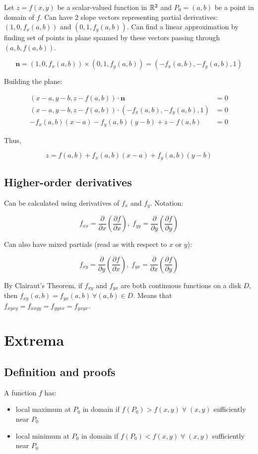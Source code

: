 Let $z=f(x,y)$ be a scalar-valued function in $\mathbb{R}^2$ and $P_0=(a,b)$ be a point in domain of $f$. Can have 2 slope vectors representing partial derivatives:
$(1,0,f_x(a,b))$ and $(0,1,f_y(a,b))$. Can find a linear approximation by finding set of points in plane spanned by these vectors passing through
$(a,b,f(a,b))$.

\[\textbf{n}=(1,0,f_x(a,b))\times(0,1,f_y(a,b))=(-f_x(a,b),-f_y(a,b),1)\]

Building the plane:

\begin{align*}
    (x-a, y-b, z-f(a, b)) \cdot \textbf{n} &=0 \\
    (x-a, y-b, z-f(a, b)) \cdot\left(-f_{x}(a, b),-f_{y}(a, b), 1\right) &=0 \\
    -f_{x}(a, b)(x-a)-f_{y}(a, b)(y-b)+z-f(a, b) &=0
\end{align*}

Thus,

\[z=f(a, b)+f_{x}(a, b)(x-a)+f_{y}(a, b)(y-b)\]

\subsection{Higher-order derivatives}

Can be calculated using derivatives of $f_x$ and $f_y$. Notation:

\[f_{xx}=\frac{\partial}{\partial x}(\frac{\partial f}{\partial x}),\; f_{yy}=\frac{\partial}{\partial y}(\frac{\partial f}{\partial y})\]

Can also have mixed partials (read as with respect to $x$ or $y$):

\[f_{xy}=\frac{\partial}{\partial y}(\frac{\partial f}{\partial x}),\; f_{yx}=\frac{\partial}{\partial x}(\frac{\partial f}{\partial y})\]

By Clairaut's Theorem, if $f_{xy}$ and $f_{yx}$ are both continuous functions on a disk $D$, then $f_{xy}(a,b)=f_{yx}(a,b)\: \forall (a,b)\in D$. Means that $f_{xyxy}=f_{xxyy}=f_{yyxx}=f_{yxyx}$.

\section{Extrema}

\subsection{Definition and proofs}

A function $f$ has:
\begin{itemize}
    \item local maximum at $P_0$ in domain if $f(P_0)>f(x,y)\;\forall\;(x,y)$ sufficiently near $P_0$
    \item local minimum at $P_0$ in domain if $f(P_0)<f(x,y)\;\forall\;(x,y)$ sufficiently near $P_0$
\end{itemize}

